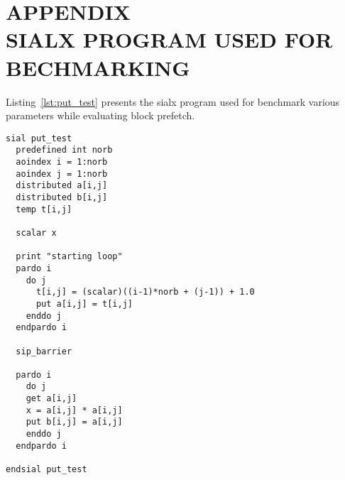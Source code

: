 


\appendix %

\chapter*{APPENDIX \\ SIALX PROGRAM USED FOR BECHMARKING} %


\setcounter{chapter}{1} %

Listing~\ref{lst:put_test} presents the sialx program used for benchmark various
parameters while evaluating block prefetch.

\begin{lstlisting}[caption={\texttt{put\_test.sialx}: sialx program used for benchmarking prefetching},
  label={lst:put_test}]
sial put_test
  predefined int norb
  aoindex i = 1:norb
  aoindex j = 1:norb
  distributed a[i,j]
  distributed b[i,j]
  temp t[i,j]

  scalar x

  print "starting loop"
  pardo i
    do j
      t[i,j] = (scalar)((i-1)*norb + (j-1)) + 1.0
      put a[i,j] = t[i,j]
    enddo j
  endpardo i

  sip_barrier

  pardo i
    do j
    get a[i,j]
    x = a[i,j] * a[i,j]
    put b[i,j] = a[i,j]
    enddo j
  endpardo i

endsial put_test
\end{lstlisting}

